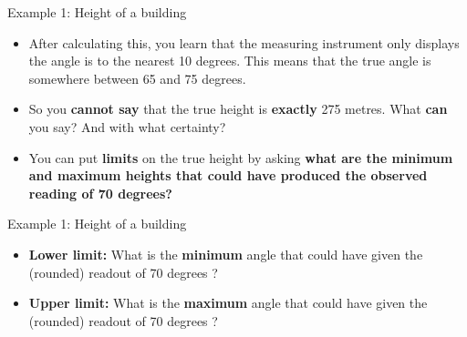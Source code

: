 \documentclass[10pt,handout]{beamer}\usepackage[]{graphicx}\usepackage[]{color}
\begin{document}
\begin{frame}{Example 1: Height of a building}
	\begin{itemize}
		\item After calculating this, you learn that the measuring instrument only
		displays the angle is to the nearest 10 degrees. This means that the
		true angle is somewhere between 65 and 75 degrees.
		
\item 		So you \textbf{cannot say} that the true height is \textbf{exactly} 275
		metres. What \textbf{can} you say? And with what certainty?
	\pause	
\item 		You can put \textbf{limits} on the true height by asking \textbf{what
			are the minimum and maximum heights that could have produced the
			observed reading of 70 degrees?}

	\end{itemize}
\end{frame}


\begin{frame}{Example 1: Height of a building}
	\begin{itemize}
		\item \textbf{Lower limit:} What is the \textbf{minimum} angle that could have given the (rounded) readout of 70 degrees ?
		
		\vspace{1in}
		
		\pause 
		
				\item \textbf{Upper limit:} What is the \textbf{maximum} angle that could have given the (rounded) readout of 70 degrees ?
		
	\end{itemize}
\end{frame}
\end{document}
